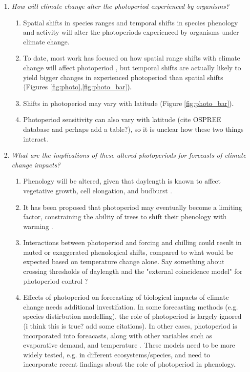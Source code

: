 \documentclass{article}
\begin{document}
\begin{enumerate}
\item\textit{How will climate change alter the photoperiod experienced by organisms?}
\begin{enumerate}
\item Spatial shifts in species ranges and temporal shifts in species phenology and activity will alter the photoperiods experienced by organisms under climate change.
\item  To date, most work has focused on how spatial range shifts with climate change will affect photoperiod \citep{saikkonen2012}, but temporal shifts are actually likely to yield bigger changes in experienced photoperiod than spatial shifts (Figures \ref{fig:photo},\ref{fig:photo_bar}).
\item Shifts in photoperiod may vary with latitude (Figure \ref{fig:photo_bar}). 
\item Photoperiod sensitivity can also vary with latitude (cite OSPREE database and perhaps add a table?), so it is unclear how these two things interact.
\end{enumerate}
\item\textit{What are the implications of these altered photoperiods for forecasts of climate change impacts?}
\begin{enumerate}
\item Phenology will be altered, given that daylength is known to affect vegetative growth, cell elongation, and budburst \citep{linkosalo2006,erwin1998,sidaway2010, hsu2011}.
\item It has been proposed that photoperiod may eventually become a limiting factor, constraining the ability of trees to shift their phenology with warming \citep{koerner2010,vitasse2013, morin2010}. 
\item Interactions between photoperiod and forcing and chilling could result in muted or exaggerated phenological shifts, compared to what would be expected based on temperature change alone. Say something about crossing thresholds of daylength and the "external coincidence model" for photoperiod control \citep{bastow2002,kobayashi2007,andres2012,singh2017}?
\item Effects of photoperiod on forecasting of biological impacts of climate change needs additional investifation. In some forecasting methods (e.g. species distirbution modelling), the role of photoperiod is largely ignored (i think this is true? add some citations). In other cases, photoperiod is incorporated into foreacasts, along with other variables such as evaporative demand, and temperature \citep [e.g. ED] []{jolly2005, medvigy2013}. These models need to be more widely tested, e.g. in different ecosystems/species, and need to incorporate recent findings about the role of photoperiod in phenology.     

\end{enumerate}
\end{enumerate}
\end{document}
